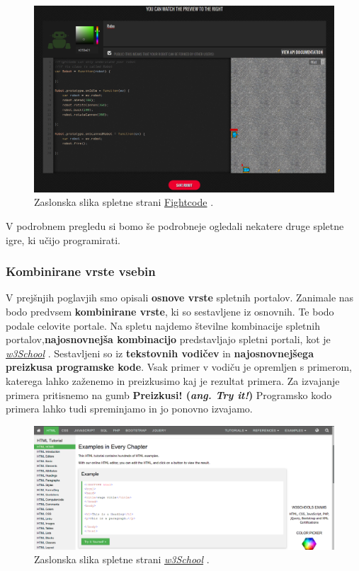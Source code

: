 \begin{figure}[h!]
    \includegraphics [width=1\linewidth, keepaspectratio =
    1] {./images/sc_web/fightRobot_01.png}
    \caption{Zaslonska slika spletne strani
      {\href{http://fightcodegame.com/}{Fightcode}}
      \cite{web:fightcode}.}
    \label{fig:scr:web:w3school}
\end{figure}

V podrobnem pregledu si bomo še podrobneje ogledali nekatere druge
spletne igre, ki učijo programirati.

\subsubsection{Kombinirane vrste vsebin}
\label{sec:kombinirane_vrste_vsebin}

V prejšnjih poglavjih smo opisali \textbf{osnove vrste} spletnih
portalov. Zanimale nas bodo predvsem \textbf{kombinirane vrste}, ki so
sestavljene iz osnovnih. Te bodo podale celovite portale. Na spletu
najdemo številne kombinacije spletnih portalov,\textbf{najosnovnejša
kombinacijo} predstavljajo spletni portali, kot je
\emph{\href{http://www.w3schools.com/}{w3School}}
\cite{web:w3school}. Sestavljeni so iz \textbf{tekstovnih vodičev} in
\textbf{najosnovnejšega preizkusa programske kode}. Vsak primer v
vodiču je opremljen s primerom, katerega lahko zaženemo in preizkusimo
kaj je rezultat primera. Za izvajanje primera pritisnemo na gumb
\textbf{Preizkusi!  (\emph{ang. Try it!})} Programsko kodo primera
lahko tudi spreminjamo in jo ponovno izvajamo.

\begin{figure}[h!]
    \includegraphics [width=1\linewidth, keepaspectratio =
    1] {./images/sc_web/w3school.png}
    \caption{Zaslonska slika spletne strani
      \emph{\href{http://www.w3schools.com/}{w3School}}
      \cite{web:w3school}.}
    \label{fig:scr:web:w3school}
\end{figure}

